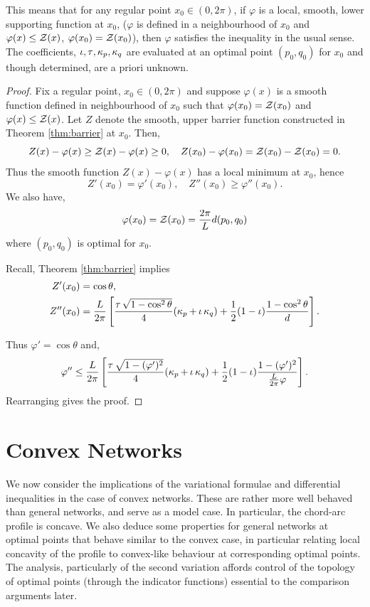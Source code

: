 \documentclass[12pt]{amsart}
\begin{document}
This means that for any regular point \(x_0 \in (0,2\pi)\), if \(\varphi\) is a local, smooth, lower supporting function at \(x_0\), (\(\varphi\) is defined in a neighbourhood of \(x_0\) and \(\varphi(x) \leq \operatorname{\mathcal{Z}} (x)\), \(\varphi(x_0) = \operatorname{\mathcal{Z}} (x_0)\)), then \(\varphi\) satisfies the inequality in the usual sense. The coefficients, \(\operatorname{\iota}, \operatorname{\tau}, \operatorname{\kappa}_p, \operatorname{\kappa}_q\) are evaluated at an optimal point \((p_0, q_0)\) for \(x_0\) and though determined, are a priori unknown.

\begin{proof}
Fix a regular point, $x_0 \in (0,2\pi)$ and suppose $\varphi(x)$ is a smooth function defined in neighbourhood of $x_0$ such that $\varphi(x_0) = \operatorname{\mathcal{Z}}(x_0)$ and $\varphi(x) \leq \operatorname{\mathcal{Z}}(x)$. Let \(Z\) denote the smooth, upper barrier function constructed in Theorem \ref{thm:barrier} at \(x_0\). Then,
\[
Z(x) - \varphi(x) \geq \operatorname{\mathcal{Z}}(x) - \varphi(x) \geq 0, \quad Z(x_0) - \varphi(x_0) = \operatorname{\mathcal{Z}}(x_0) - \operatorname{\mathcal{Z}}(x_0) = 0.
\]
Thus the smooth function \(Z(x) - \varphi(x)\) has a local minimum at \(x_0\), hence
\[
Z'(x_0) = \varphi'(x_0), \quad Z''(x_0) \geq \varphi''(x_0).
\]
We also have,
\[
\varphi(x_0) = \operatorname{\mathcal{Z}}(x_0) = \frac{2\pi}{L} d(p_0, q_0)
\]
where \((p_0, q_0)\) is optimal for \(x_0\).

Recall, Theorem \ref{thm:barrier} implies
\begin{align*}
Z'(x_0) &= \cos \theta, \\
Z''(x_0) &= \frac{L}{2\pi}\left[\frac{\operatorname{\tau}\sqrt{1-\cos^2\theta}}{4} (\operatorname{\kappa}_p + \operatorname{\iota}\operatorname{\kappa}_q) + \frac{1}{2} (1-\operatorname{\iota}) \frac{1-\cos^2\theta}{d}\right].
\end{align*}

Thus \(\varphi' = \cos \theta\) and,
\[
\varphi'' \leq \frac{L}{2\pi}\left[\frac{\operatorname{\tau}\sqrt{1-(\varphi')^2}}{4} (\operatorname{\kappa}_p + \operatorname{\iota}\operatorname{\kappa}_q) + \frac{1}{2} (1-\operatorname{\iota}) \frac{1-(\varphi')^2}{\tfrac{L}{2\pi} \varphi}\right].
\]
Rearranging gives the proof.
\end{proof}

\section{Convex Networks}

We now consider the implications of the variational formulae and differential inequalities in the case of convex networks. These are rather more well behaved than general networks, and serve as a model case. In particular, the chord-arc profile is concave. We also deduce some properties for general networks at optimal points that behave similar to the convex case, in particular relating local concavity of the profile to convex-like behaviour at corresponding optimal points. The analysis, particularly of the second variation affords control of the topology of optimal points (through the indicator functions) essential to the comparison arguments later.
\end{document}
